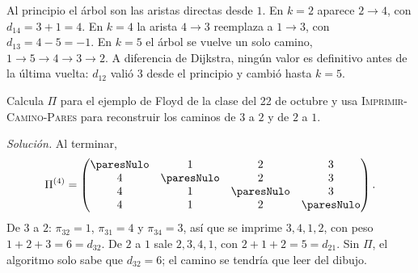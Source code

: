 \documentclass[11pt,letterpaper]{article}
\begin{document}
\begin{center}
\hspace{0.1cm}
\end{center}

Al principio el árbol son las aristas directas desde $1$. En $k = 2$
aparece $2 \to 4$, con $d_{14} = 3 + 1 = 4$. En $k = 4$ la arista
$4 \to 3$ reemplaza a $1 \to 3$, con $d_{13} = 4 - 5 = -1$. En $k = 5$
el árbol se vuelve un solo camino, $1 \to 5 \to 4 \to 3 \to 2$. A
diferencia de Dijkstra, ningún valor es definitivo antes de la última
vuelta: $d_{12}$ valió $3$ desde el principio y cambió hasta $k = 5$.

\begin{ejercicio}
  \label{ej:pi-clase-floyd}
  Calcula $\Pi$ para el ejemplo de Floyd de la clase del 22 de octubre
  y usa \textsc{Imprimir-Camino-Pares} para reconstruir los caminos de
  $3$ a $2$ y de $2$ a $1$.

  \emph{Solución.} Al terminar,
  \[
    \Pi^{(4)} = \begin{pmatrix}
      \paresNulo & 1 & 2 & 3 \\
      4 & \paresNulo & 2 & 3 \\
      4 & 1 & \paresNulo & 3 \\
      4 & 1 & 2 & \paresNulo
    \end{pmatrix} .
  \]
  De $3$ a $2$: $\pi_{32} = 1$, $\pi_{31} = 4$ y $\pi_{34} = 3$, así
  que se imprime $3, 4, 1, 2$, con peso $1 + 2 + 3 = 6 = d_{32}$. De
  $2$ a $1$ sale $2, 3, 4, 1$, con $2 + 1 + 2 = 5 = d_{21}$. Sin $\Pi$,
  el algoritmo solo sabe que $d_{32} = 6$; el camino se tendría que
  leer del dibujo.
\end{ejercicio}
\end{document}
